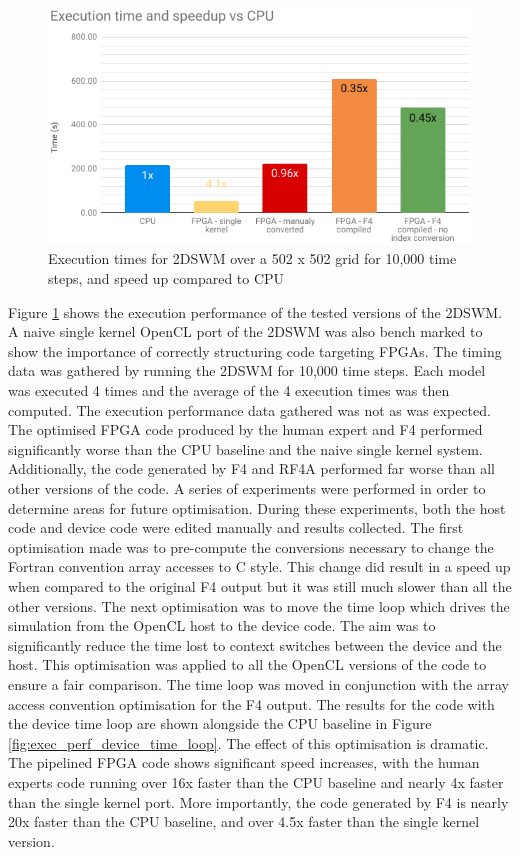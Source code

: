 \documentclass{mpaper}
\begin{document}
\begin{figure}
    \centering
    \includegraphics[scale=0.40]{images/Execution_Time_and_Speedup_vs_CPU.png}
    \caption{Execution times for 2DSWM over a 502 x 502 grid for 10,000 time steps, and speed up compared to CPU}
    \label{fig:exec_perf}
\end{figure}

Figure \ref{fig:exec_perf} shows the execution performance of the tested versions of the 2DSWM.
A naive single kernel OpenCL port of the 2DSWM was also bench marked to show the importance of correctly structuring code targeting FPGAs.
The timing data was gathered by running the 2DSWM for 10,000 time steps.
Each model was executed 4 times and the average of the 4 execution times was then computed. 
The execution performance data gathered was not as was expected.
The optimised FPGA code produced by the human expert and F4 performed significantly worse than the CPU baseline and the naive single kernel system.
Additionally, the code generated by F4 and RF4A performed far worse than all other versions of the code. 
A series of experiments were performed in order to determine areas for future optimisation. 
During these experiments, both the host code and device code were edited manually and results collected.
The first optimisation made was to pre-compute the conversions necessary to change the Fortran convention array accesses to C style.
This change did result in a speed up when compared to the original F4 output but it was still much slower than all the other versions. 
The next optimisation was to move the time loop which drives the simulation from the OpenCL host to the device code.
The aim was to significantly reduce the time lost to context switches between the device and the host. 
This optimisation was applied to all the OpenCL versions of the code to ensure a fair comparison.
The time loop was moved in conjunction with the array access convention optimisation for the F4 output.
The results for the code with the device time loop are shown alongside the CPU baseline in Figure \ref{fig:exec_perf_device_time_loop}.
The effect of this optimisation is dramatic. 
The pipelined FPGA code shows significant speed increases, with the human experts code running over 16x faster than the CPU baseline and nearly 4x faster than the single kernel port.
More importantly, the code generated by F4 is nearly 20x faster than the CPU baseline, and over 4.5x faster than the single kernel version.
\end{document}
